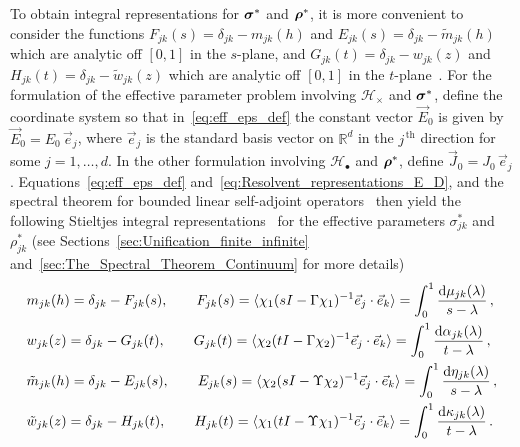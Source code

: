 \documentclass{cmslatex}
\renewcommand{\d}{\text{d}}
\newcommand\bsig{\mbox{\boldmath${\sigma}$}}
\newcommand\brho{\mbox{\boldmath${\rho}$}}
\begin{document}
To obtain integral representations for $\bsig^*$ and
$\brho^*$, it is more convenient to consider the functions 
$F_{jk}(s)=\delta_{jk}-m_{jk}(h)$ and $E_{jk}(s)=\delta_{jk}-\tilde{m}_{jk}(h)$
which are analytic off $[0,1]$ in the $s$-plane, and
$G_{jk}(t)=\delta_{jk}-w_{jk}(z)$ and $H_{jk}(t)=\delta_{jk}-\tilde{w}_{jk}(z)$
which are analytic off $[0,1]$ in the
$t$-plane~\cite{Golden:CMP-473}. For the formulation of the effective
parameter problem involving $\mathscr{H}_\times$ and $\bsig^*$, define the
coordinate system so that in~\eqref{eq:eff_eps_def} the constant
vector $\vec{E}_0$ is given by $\vec{E}_0=E_0\,\vec{e}_j$, where
$\vec{e}_j$ is the standard basis vector on $\mathbb{R}^d$ in the
$j^{\,\text{th}}$ direction for some $j=1,\ldots,d$. In the other
formulation involving $\mathscr{H}_\bullet$ and $\brho^*$, define
$\vec{J}_0=J_0\,\vec{e}_j$. Equations~\eqref{eq:eff_eps_def}
and~\eqref{eq:Resolvent_representations_E_D}, and the spectral theorem
for 
bounded linear self-adjoint operators~\cite{Reed-1980,Stone:64} then
yield the following Stieltjes integral
representations~\cite{Golden:CMP-473,Bergman:PRC-377,Bergman:AP-78,Murphy:JMP:063506}    
for the effective parameters $\sigma^*_{jk}$ and $\rho^*_{jk}$ (see
Sections~\ref{sec:Unification_finite_infinite}
and~\ref{sec:The_Spectral_Theorem_Continuum} for more details)  
%
\begin{align}\label{eq:Stieltjes_F}
  &m_{jk}(h)=\delta_{jk}-F_{jk}(s), \qquad
  F_{jk}(s)=\langle\chi_1(sI-\Gamma\chi_1)^{-1}\vec{e}_j\cdot\vec{e}_k\rangle=\int_0^1\frac{\d\mu_{jk}(\lambda)}{s-\lambda}\,,
  \\
  &w_{jk}(z)=\delta_{jk}-G_{jk}(t), \qquad
  G_{jk}(t)=\langle\chi_2(tI-\Gamma\chi_2)^{-1}\vec{e}_j\cdot\vec{e}_k\rangle=\int_0^1\frac{\d\alpha_{jk}(\lambda)}{t-\lambda}\,,
  \notag \\
  &\tilde{m}_{jk}(h)=\delta_{jk}-E_{jk}(s), \qquad
  E_{jk}(s)=\langle\chi_2(sI-\Upsilon\chi_2)^{-1}\vec{e}_j\cdot\vec{e}_k\rangle=\int_0^1\frac{\d\eta_{jk}(\lambda)}{s-\lambda}\,,
  \notag \\
  &\tilde{w}_{jk}(z)=\delta_{jk}-H_{jk}(t), \qquad
  H_{jk}(t)=\langle\chi_1(tI-\Upsilon\chi_1)^{-1}\vec{e}_j\cdot\vec{e}_k\rangle=\int_0^1\frac{\d\kappa_{jk}(\lambda)}{t-\lambda}\,.
  \notag
\end{align}
%
\end{document}
